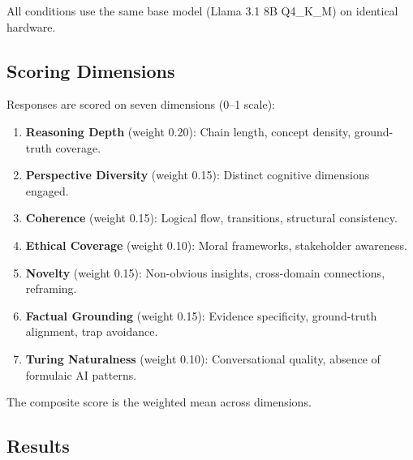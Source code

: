 \documentclass[11pt,a4paper]{article}
\begin{document}
All conditions use the same base model (Llama 3.1 8B Q4\_K\_M) on identical hardware.

\subsection{Scoring Dimensions}

Responses are scored on seven dimensions (0--1 scale):

\begin{enumerate}[nosep]
  \item \textbf{Reasoning Depth} (weight 0.20): Chain length, concept density, ground-truth coverage.
  \item \textbf{Perspective Diversity} (weight 0.15): Distinct cognitive dimensions engaged.
  \item \textbf{Coherence} (weight 0.15): Logical flow, transitions, structural consistency.
  \item \textbf{Ethical Coverage} (weight 0.10): Moral frameworks, stakeholder awareness.
  \item \textbf{Novelty} (weight 0.15): Non-obvious insights, cross-domain connections, reframing.
  \item \textbf{Factual Grounding} (weight 0.15): Evidence specificity, ground-truth alignment, trap avoidance.
  \item \textbf{Turing Naturalness} (weight 0.10): Conversational quality, absence of formulaic AI patterns.
\end{enumerate}

The composite score is the weighted mean across dimensions.

\subsection{Results}
\end{document}
